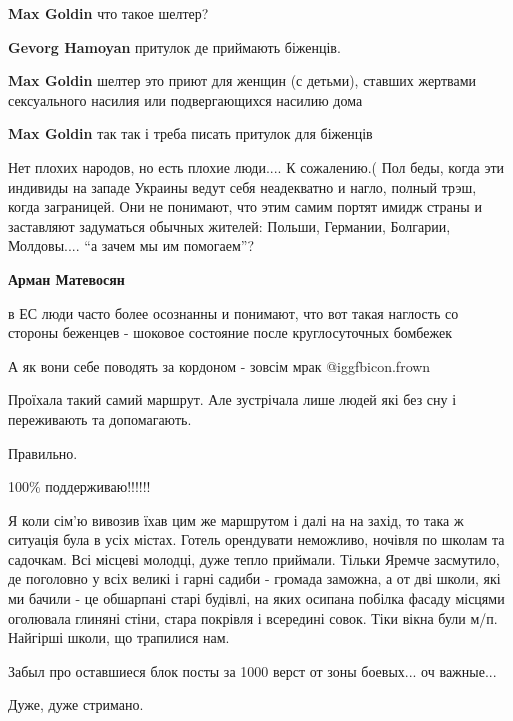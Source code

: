 \begin{itemize}
\begin{itemize}
\textbf{Max Goldin} что такое шелтер?

\textbf{Gevorg Hamoyan} притулок де приймають біженців.

\textbf{Max Goldin} шелтер это приют для женщин (с детьми), ставших жертвами сексуального насилия или подвергающихся насилию дома

\textbf{Max Goldin} так так і треба писать притулок для біженців

\end{itemize} %


Нет плохих народов, но есть плохие люди.... К сожалению.( Пол беды, когда эти
индивиды на западе Украины ведут себя неадекватно и нагло, полный трэш, когда
заграницей. Они не понимают, что этим самим портят имидж страны и заставляют
задуматься обычных жителей: Польши, Германии, Болгарии, Молдовы.... \enquote{а зачем мы
им помогаем}?

\textbf{Арман Матевосян} 

в ЕС люди часто более осознанны и понимают, что вот такая наглость со стороны
беженцев - шоковое состояние после круглосуточных бомбежек

А як вони себе поводять за кордоном - зовсім мрак  @igg{fbicon.frown} 

Проїхала такий самий маршрут. Але зустрічала лише людей які без сну і переживають та допомагають.

Правильно.

100\% поддерживаю!!!!!!


Я коли сім'ю вивозив їхав цим же маршрутом і далі на на захід, то така ж
ситуація була в усіх містах. Готель орендувати неможливо, ночівля по школам та
садочкам. Всі місцеві молодці, дуже тепло приймали. Тільки Яремче засмутило, де
поголовно у всіх великі і гарні садиби - громада заможна, а от дві школи, які
ми бачили - це обшарпані старі будівлі, на яких осипана побілка фасаду місцями
оголювала глиняні стіни, стара покрівля і всередині совок. Тіки вікна були м/п.
Найгірші школи, що трапилися нам.

Забыл про оставшиеся блок посты за 1000 верст от зоны боевых... оч важные...

Дуже, дуже стримано.


\end{itemize}
